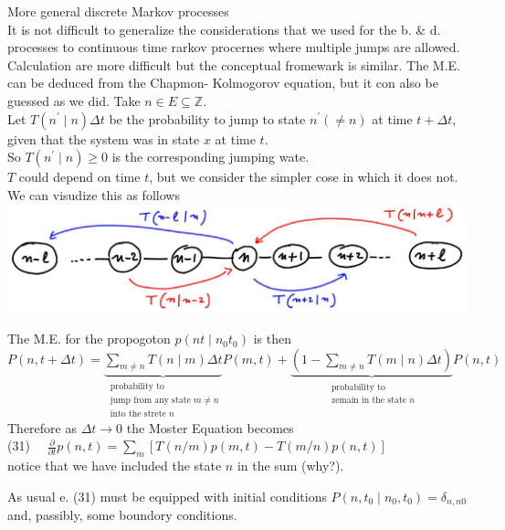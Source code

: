 \documentclass[10pt]{article}
\begin{document}
More general discrete Markov processes\\
It is not difficult to generalize the considerations that we used for the b. \& d. processes to continuous time rarkov procernes where multiple jumps are allowed. Calculation are more difficult but the conceptual fromewark is similar. The M.E. can be deduced from the Chapmon- Kolmogorov equation, but it con also be guessed as we did. Take $n \in E \subseteq \mathbb{Z}$.\\
Let $T\left(n^{\prime} \mid n\right) \Delta t$ be the probability to jump to state $n^{\prime}(\neq n)$ at time $t+\Delta t$, given that the system was in state $x$ at time $t$.\\
So $T\left(n^{\prime} \mid n\right) \geqslant 0$ is the corresponding jumping wate.\\
$T$ could depend on time $t$, but we consider the simpler cose in which it does not. We can visudize this as follows\\
\includegraphics[max width=\textwidth, center]{2025_10_17_3daf2a002a8f5936c90eg-19}

The M.E. for the propogoton $p\left(n t \mid n_{0} t_{0}\right)$ is then\\
$P(n, t+\Delta t)=\underbrace{\sum_{m \neq n} T(n \mid m) \Delta t}_{\substack{\text { probability to } \\ \text { jump from any state } m \neq n \\ \text { into the strete } n}} P(m, t)+\underbrace{\left(1-\sum_{m \neq n} T(m \mid n) \Delta t\right)}_{\substack{\text { probability to } \\ \text { zemain in the state } n}} P(n, t)$\\
Therefore as $\Delta t \rightarrow 0$ the Moster Equation becomes\\
(31) $\quad \frac{\partial}{\partial t} p(n, t)=\sum_{m}[T(n / m) p(m, t)-T(m / n) p(n, t)]$\\
notice that we have included the state $n$ in the sum (why?).

As usual e. (31) must be equipped with initial conditions $P\left(n, t_{0} \mid n_{0}, t_{0}\right)=\delta_{n, n 0}$ and, passibly, some boundory conditions.
\end{document}
